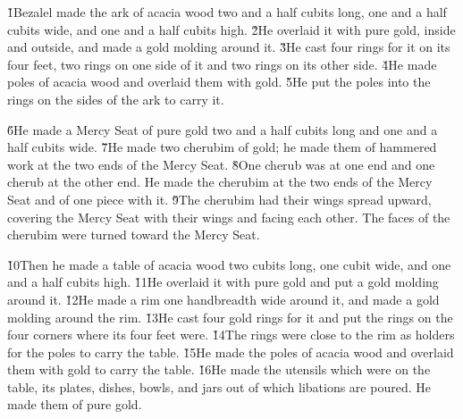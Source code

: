 \v{1}Bezalel made the ark of acacia wood two and a half cubits long, one and a half cubits wide, and one and a half cubits high. \v{2}He overlaid it with pure gold, inside and outside, and made a gold molding around it. \v{3}He cast four rings for it on its four feet, two rings on one side of it and two rings on its other side. \v{4}He made poles of acacia wood and overlaid them with gold. \v{5}He put the poles into the rings on the sides of the ark to carry it.

\v{6}He made a Mercy Seat of pure gold two and a half cubits long and one and a half cubits wide. \v{7}He made two cherubim of gold; he made them of hammered work at the two ends of the Mercy Seat. \v{8}One cherub was at one end and one cherub at the other end. He made the cherubim at the two ends of the Mercy Seat and of one piece with it. \v{9}The cherubim had their wings spread upward, covering the Mercy Seat with their wings and facing each other. The faces of the cherubim were turned toward the Mercy Seat.

\v{10}Then he made a table of acacia wood two cubits long, one cubit wide, and one and a half cubits high. \v{11}He overlaid it with pure gold and put a gold molding around it. \v{12}He made a rim one handbreadth wide around it, and made a gold molding around the rim. \v{13}He cast four gold rings for it and put the rings on the four corners where its four feet were. \v{14}The rings were close to the rim as holders for the poles to carry the table. \v{15}He made the poles of acacia wood and overlaid them with gold to carry the table. \v{16}He made the utensils which were on the table, its plates, dishes, bowls, and jars out of which libations are poured. He made them of pure gold.

